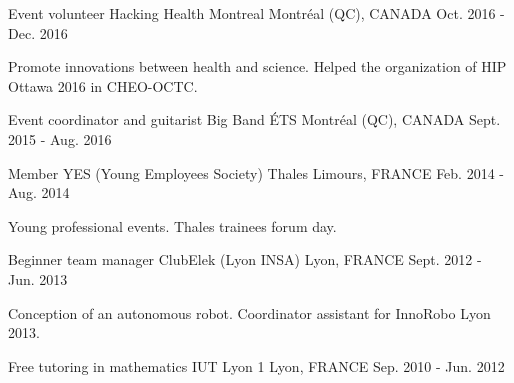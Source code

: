 


\begin{cventries}


\cventry
{Event volunteer} %
{Hacking Health Montreal} %
{\hspace{-5mm}Montréal (QC), CANADA} %
{Oct. 2016 - Dec. 2016} %
{ %
\begin{cvitems}
\item {Promote innovations between health and science. Helped the organization of HIP Ottawa 2016 in CHEO-OCTC.}
\end{cvitems}
}

\cventry
{Event coordinator and guitarist} %
{Big Band ÉTS} %
{\hspace{-5mm}Montréal (QC), CANADA} %
{Sept. 2015 - Aug. 2016} %
{ %
}

\vspace{-3mm}
\cventry
{Member} %
{YES (Young Employees Society) Thales} %
{Limours, FRANCE} %
{Feb. 2014 - Aug. 2014} %
{ %
\begin{cvitems}
\item {Young professional events. Thales trainees forum day.}
\end{cvitems}
}

\cventry
{Beginner team manager} %
{ClubElek (Lyon INSA)} %
{Lyon, FRANCE} %
{Sept. 2012 - Jun. 2013} %
{ %
\begin{cvitems}
\item{Conception of an autonomous robot. Coordinator assistant for InnoRobo Lyon 2013.}
\end{cvitems}
}

\cventry
{Free tutoring in mathematics} %
{IUT Lyon 1} %
{Lyon, FRANCE} %
{Sep. 2010 - Jun. 2012} %
{ %
}


\end{cventries}
